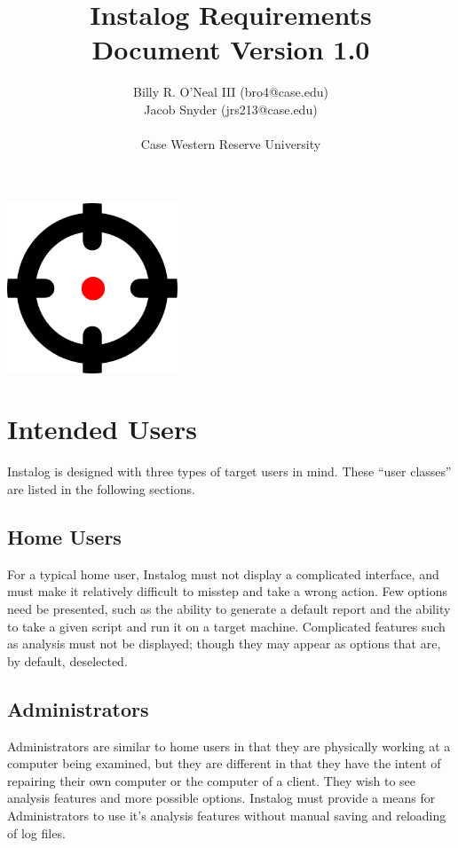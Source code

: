 \documentclass[letterpaper,12pt]{article}
\title{Instalog Requirements \\ Document Version 1.0}
\author{
Billy R. O'Neal III (bro4@case.edu) \\
Jacob Snyder (jrs213@case.edu) \\ \\
Case Western Reserve University
}
\begin{document}
\maketitle
\vspace{1in}
\begin{center}
\includegraphics[width=2in, height=2in]{figures/InstalogLogo.png}
\end{center}
\newpage



\tableofcontents
\newpage



\section{Intended Users}
Instalog is designed with three types of target users in mind. These ``user
classes'' are listed in the following sections.

\subsection{Home Users}
For a typical home user, Instalog must not display a complicated interface, and
must make it relatively difficult to misstep and take a wrong action. Few
options need be presented, such as the ability to generate a default report and
the ability to take a given script and run it on a target machine. Complicated
features such as analysis must not be displayed; though they may appear as
options that are, by default, deselected.

\subsection{Administrators}
Administrators are similar to home users in that they are physically working at
a computer being examined, but they are different in that they have the intent of
repairing their own computer or the computer of a client. They wish to see
analysis features and more possible options. Instalog must provide a means for
Administrators to use it's analysis features without manual saving and reloading
of log files.
\end{document}
